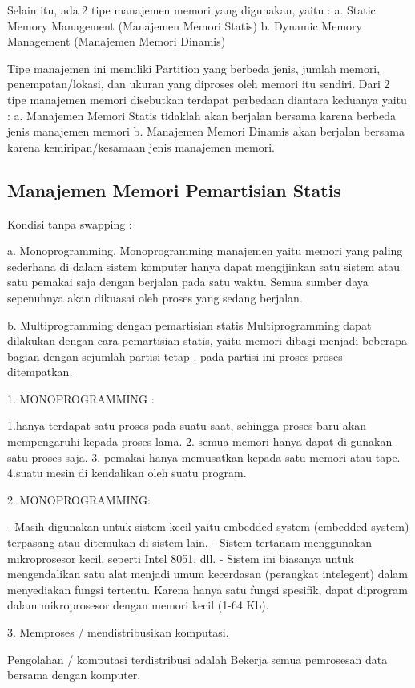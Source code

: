 Selain itu, ada 2 tipe manajemen memori yang digunakan, yaitu :
a. Static Memory Management (Manajemen Memori Statis)
b. Dynamic Memory Management (Manajemen Memori Dinamis)

Tipe manajemen ini memiliki Partition yang berbeda jenis, jumlah memori, penempatan/lokasi, dan ukuran yang diproses
oleh memori itu sendiri. Dari 2 tipe manajemen memori disebutkan terdapat perbedaan diantara keduanya yaitu :
a. Manajemen Memori Statis  tidaklah akan berjalan bersama karena berbeda jenis manajemen memori
b. Manajemen Memori Dinamis akan berjalan bersama karena kemiripan/kesamaan jenis manajemen memori.

\subsection {Manajemen Memori Pemartisian Statis}

Kondisi tanpa swapping :

a. Monoprogramming.
Monoprogramming manajemen yaitu memori yang paling sederhana di dalam sistem komputer hanya dapat mengijinkan satu sistem atau satu pemakai saja dengan berjalan pada satu waktu. Semua sumber daya sepenuhnya akan dikuasai oleh proses yang sedang berjalan.

b. Multiprogramming dengan pemartisian statis
Multiprogramming dapat dilakukan dengan cara pemartisian statis, yaitu memori dibagi menjadi beberapa bagian dengan sejumlah partisi tetap . pada partisi ini proses-proses ditempatkan.

1. MONOPROGRAMMING :

	1.hanya terdapat satu proses pada suatu saat, sehingga proses baru akan mempengaruhi kepada proses lama.
	2. semua memori hanya dapat di gunakan satu proses saja.
	3. pemakai hanya memusatkan kepada satu memori atau tape.
	4.suatu mesin di kendalikan oleh suatu program.

2. MONOPROGRAMMING:

- Masih digunakan untuk sistem kecil yaitu embedded system (embedded system)
terpasang atau ditemukan di sistem lain.
- Sistem tertanam menggunakan mikroprosesor kecil, seperti Intel 8051,
dll.
- Sistem ini biasanya untuk mengendalikan satu alat menjadi umum
kecerdasan (perangkat intelegent) dalam menyediakan fungsi tertentu. Karena
hanya satu fungsi spesifik, dapat diprogram dalam mikroprosesor dengan memori
kecil (1-64 Kb).

3. Memproses / mendistribusikan komputasi.

Pengolahan / komputasi terdistribusi adalah Bekerja semua pemrosesan data bersama dengan komputer.


